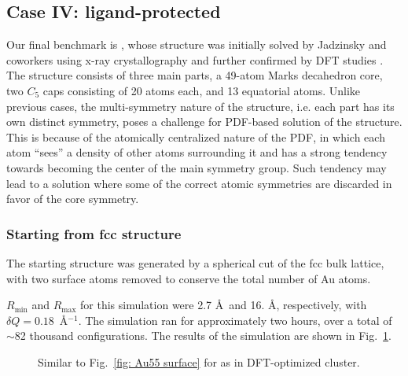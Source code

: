 \subsection{Case IV: ligand-protected }
Our final benchmark is , whose structure was initially solved by Jadzinsky and coworkers using x-ray crystallography \cite{Jadzinsky2007} and further confirmed by DFT studies \cite{Li2008}. The  structure consists of three main parts, a 49-atom Marks decahedron core, two $C_{5}$ caps consisting of 20 atoms each, and 13 equatorial atoms. Unlike previous cases, the multi-symmetry nature of the structure, i.e. each part has its own distinct symmetry,  poses a  challenge for PDF-based solution of the structure. This is because of the atomically centralized nature of the PDF, in which each atom ``sees'' a density of other atoms surrounding it and has a strong tendency towards becoming the center of the main symmetry group. Such tendency may lead to a solution where some of the correct atomic symmetries are discarded in favor of the core symmetry.

\subsubsection{ Starting from fcc structure}
The starting structure was generated by a spherical cut of the fcc bulk lattice, with two surface atoms removed to conserve the total number of Au atoms.

 $R_\mathrm{min}$ and $R_\mathrm{max}$ for this simulation were 2.7 \AA ~and 16. \AA, respectively, with $\delta Q=0.18$~\AA$^{-1}$. The simulation ran for approximately two hours, over a total of $\sim$82 thousand configurations.  The results of the simulation are shown in Fig.~\ref{fig:Au102_fcc}.
\begin{figure}
  \def \localimgpath {Au_102_HMC_paper_final/55d7b3d4d2d355710ddb3fdc}
  \centering
    \quad
    \quad
    \quad
    \quad
    \quad
    \quad


  \caption{Similar to Fig.~\ref{fig: Au55 surface} for   as in DFT-optimized  cluster.}
  \label{fig:Au102_fcc}
\end{figure}

